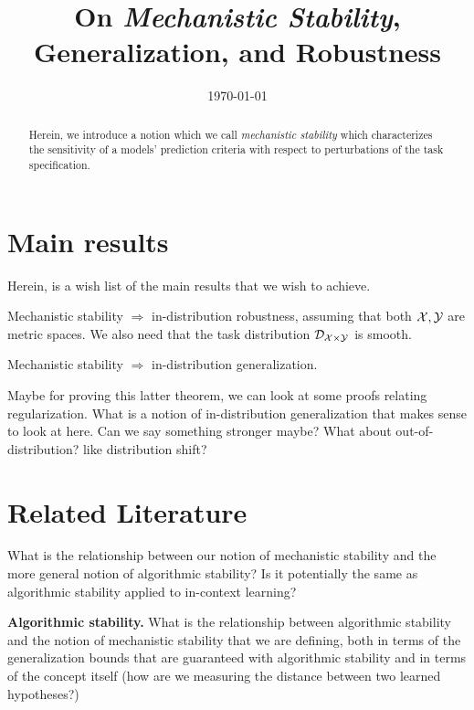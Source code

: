 \documentclass[10pt]{article}
\title{On \textit{Mechanistic Stability}, Generalization, and Robustness}
\date{\today}
\begin{document}
\ifthenelse{\isundefined{\showlinenum}}{
}{
\linenumbers
}
\maketitle

\begin{abstract}
Herein, we introduce a notion which we call \textit{mechanistic stability} which
characterizes the sensitivity of a models' prediction criteria with respect to
perturbations of the task specification.
\end{abstract}

{
\begin{spacing}{1}
\tableofcontents
\end{spacing}
}
\clearpage
\setcounter{page}{1}

\allowdisplaybreaks



\section{Main results}
Herein, is a wish list of the main results that we wish to achieve.
\begin{thm}
Mechanistic stability $\Rightarrow$ in-distribution 
robustness, assuming that both $\mathcal{X}, \mathcal{Y}$ are metric spaces. 
We also need that the task distribution $\mathcal{D}_{\mathcal{X}\times \mathcal{Y}}$ is smooth.
\end{thm}
\begin{thm}
Mechanistic stability $\Rightarrow$ in-distribution generalization.
\end{thm}
Maybe for proving this latter theorem, we can look at some proofs relating regularization.
What is a notion of in-distribution generalization that makes sense to look
at here. Can we say something stronger maybe? What about out-of-distribution?
like distribution shift?


\section{Related Literature}
What is the relationship between our notion of mechanistic stability and 
the more general notion of algorithmic stability? Is it potentially the same
as algorithmic stability applied to in-context learning?

\textbf{Algorithmic stability.} What is the relationship between algorithmic
stability and the notion of mechanistic stability that we are defining, both
in terms of the generalization bounds that are guaranteed with algorithmic
stability and in terms of the concept itself (how are we measuring
the distance between two learned hypotheses?)
\end{document}
